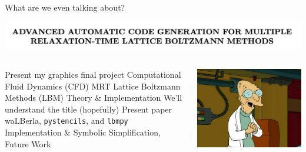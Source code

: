 \begin{frame}{What are we even talking about?}
  \begin{center}
    \includegraphics[width=0.8\linewidth]{title_header.png}
  \end{center}
  \begin{columns}
  \begin{outline}
    \1 Present my graphics final project
    \2 Computational Fluid Dynamics (CFD)
    \2 MRT Lattice Boltzmann Methods (LBM)
    \2 Theory \& Implementation
    \2 We'll understand the title (hopefully) 
    \1 Present paper
      \2 waLBerla, \lstinline{pystencils}, and \lstinline{lbmpy}
      \2 Implementation \& Symbolic Simplification, 
    \1 Future Work
  \end{outline}

  \centering
  \begin{center}
    \includegraphics[width=\linewidth]{professor.png}
  \end{center}
  \end{columns}
\end{frame}
